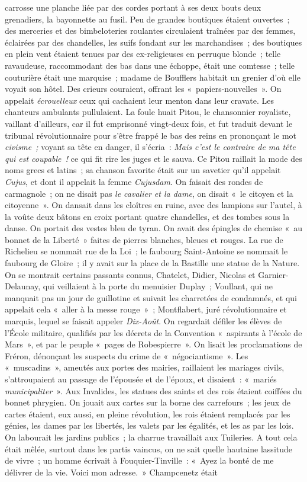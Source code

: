 \documentclass[french,twoside]{book} %
\begin{document}
carrosse une planche liée par des cordes portant à ses deux bouts deux grenadiers, la bayonnette au fusil. Peu de grandes boutiques étaient ouvertes ; des merceries et des bimbeloteries roulantes circulaient traînées par des femmes, éclairées par des chandelles, les suifs fondant sur les marchandises ; des boutiques en plein vent étaient tenues par des ex-religieuses en perruque blonde ; telle ravaudeuse, raccommodant des bas dans une échoppe, était une comtesse ; telle couturière était une marquise ; madame de Boufflers habitait un grenier d’où elle voyait son hôtel. Des crieurs couraient, offrant les « papiers-nouvelles ». On appelait \emph{écrouelleux} ceux qui cachaient leur menton dans leur cravate. Les chanteurs ambulants pullulaient. La foule huait Pitou, le chansonnier royaliste, vaillant d’ailleurs, car il fut emprisonné vingt-deux fois, et fut traduit devant le tribunal révolutionnaire pour s’être frappé le bas des reins en prononçant le mot \emph{civisme ;} voyant sa tête en danger, il s’écria : \emph{Mais c’est le contraire de ma tête qui  est coupable !} ce qui fit rire les juges et le sauva. Ce Pitou raillait la mode des noms grecs et latins ; sa chanson favorite était sur un savetier qu’il appelait \emph{Cujus}, et dont il appelait la femme \emph{Cujusdam}. On faisait des rondes de carmagnole ; on ne disait pas \emph{le cavalier et la dame}, on disait « le citoyen et la citoyenne ». On dansait dans les cloîtres en ruine, avec des lampions sur l’autel, à la voûte deux bâtons en croix portant quatre chandelles, et des tombes sous la danse. On portait des vestes bleu de tyran. On avait des épingles de chemise « au bonnet de la Liberté » faites de pierres blanches, bleues et rouges. La rue de Richelieu se nommait rue de la Loi ; le faubourg Saint-Antoine se nommait le faubourg de Gloire ; il y avait sur la place de la Bastille une statue de la Nature. On se montrait certains passants connus, Chatelet, Didier, Nicolas et Garnier-Delaunay, qui veillaient à la porte du menuisier Duplay ; Voullant, qui ne manquait pas un jour de guillotine et suivait les charretées de condamnés, et qui appelait cela « aller à la messe rouge » ; Montflabert, juré révolutionnaire et marquis, lequel se faisait appeler \emph{Dix-Août}. On regardait défiler les élèves de l’École militaire, qualifiés par les décrets de la Convention « aspirants à l’école de Mars », et par le peuple « pages de Robespierre ». On lisait les proclamations de Fréron, dénonçant les suspects du crime de « négociantisme ». Les « muscadins », ameutés aux portes des mairies, raillaient les mariages civils, s’attroupaient au passage de l’épousée et de l’époux, et  disaient : « mariés \emph{municipaliter} ». Aux Invalides, les statues des saints et des rois étaient coiffées du bonnet phrygien. On jouait aux cartes sur la borne des carrefours ; les jeux de cartes étaient, eux aussi, en pleine révolution, les rois étaient remplacés par les génies, les dames par les libertés, les valets par les égalités, et les as par les lois. On labourait les jardins publics ; la charrue travaillait aux Tuileries. A tout cela était mêlée, surtout dans les partis vaincus, on ne sait quelle hautaine lassitude de vivre ; un homme écrivait à Fouquier-Tinville : « Ayez la bonté de me délivrer de la vie. Voici mon adresse. » Champcenetz était 
\end{document}
